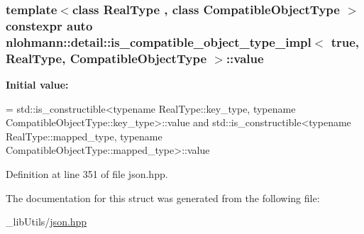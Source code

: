 \subsubsection[{\texorpdfstring{value}{value}}]{\setlength{\rightskip}{0pt plus 5cm}template$<$class Real\+Type , class Compatible\+Object\+Type $>$ constexpr auto {\bf nlohmann\+::detail\+::is\+\_\+compatible\+\_\+object\+\_\+type\+\_\+impl}$<$ true, Real\+Type, Compatible\+Object\+Type $>$\+::value\hspace{0.3cm}{\ttfamily [static]}}\hypertarget{structnlohmann_1_1detail_1_1is__compatible__object__type__impl_3_01true_00_01_real_type_00_01_compatible_object_type_01_4_afa131fcd3a4fc1881dd350a04589e6cf}{}\label{structnlohmann_1_1detail_1_1is__compatible__object__type__impl_3_01true_00_01_real_type_00_01_compatible_object_type_01_4_afa131fcd3a4fc1881dd350a04589e6cf}
{\bfseries Initial value\+:}
\begin{DoxyCode}
=
        std::is\_constructible<typename RealType::key\_type, typename CompatibleObjectType::key\_type>::value 
      and
        std::is\_constructible<typename RealType::mapped\_type, typename
       CompatibleObjectType::mapped\_type>::value
\end{DoxyCode}


Definition at line 351 of file json.\+hpp.



The documentation for this struct was generated from the following file\+:\begin{DoxyCompactItemize}
\item 
\+\_\+lib\+Utils/\hyperlink{json_8hpp}{json.\+hpp}\end{DoxyCompactItemize}
